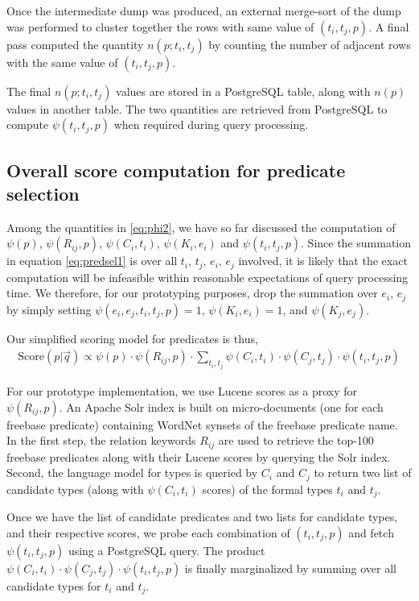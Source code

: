 \documentclass[a4paper, twoside, 12pt]{report}
\begin{document}
Once the intermediate dump was produced, an external merge-sort of the dump was performed to cluster together the rows with same value of $(t_i,t_j,p)$. A final pass computed the quantity $n(p;t_i,t_j)$ by counting the number of adjacent rows with the same value of $(t_i, t_j,p)$.

The final $n(p;t_i,t_j)$ values are stored in a PostgreSQL table, along with $n(p)$ values in another table. The two quantities are retrieved from PostgreSQL to compute $\psi(t_i,t_j,p)$ when required during query processing.

\subsection{Overall score computation for predicate selection}
Among the quantities in \ref{eq:phi2}, we have so far discussed the computation of $\psi(p)$, $\psi(R_{ij},p)$, $\psi(C_i,t_i)$, $\psi(K_i,e_i)$ and $\psi(t_i,t_j,p)$. Since the summation in equation \ref{eq:predsel1} is over all $t_i$, $t_j$, $e_i$, $e_j$ involved, it is likely that the exact computation will be infeasible within reasonable expectations of query processing time. We therefore, for our prototyping purposes, drop the summation over $e_i$, $e_j$ by simply setting $\psi(e_i,e_j,t_i,	t_j,p) = 1$, $\psi(K_i,e_i) = 1$, and $\psi(K_j,e_j)$.

Our simplified scoring model for predicates is thus, 
\begin{align}
\text{Score}(p|\vec{q}) \propto \psi(p) \cdot \psi(R_{ij},p) \cdot \sum_{t_i,t_j} \psi(C_i,t_i) \cdot \psi(C_j,t_j) \cdot \psi(t_i,t_j,p) \label{eq:predselfinal}
\end{align}

For our prototype implementation, we use Lucene scores as a proxy for $\psi(R_{ij}, p)$. An Apache Solr index is built on micro-documents (one for each freebase predicate) containing WordNet synsets of the freebase predicate name. In the first step, the relation keywords $R_{ij}$ are used to retrieve the top-100 freebase predicates along with their Lucene scores by querying the Solr index. Second, the language model for types is queried by $C_i$ and $C_j$ to return two list of candidate types (along with $\psi(C_i,t_i)$ scores) of the formal types $t_i$ and $t_j$.

Once we have the list of candidate predicates and two lists for candidate types, and their respective scores, we probe each combination of $(t_i,t_j,p)$
 and fetch $\psi(t_i,t_j,p)$ using a PostgreSQL query. The product $\psi(C_i,t_i) \cdot \psi(C_j,t_j) \cdot \psi(t_i,t_j,p)$ is finally marginalized by summing over all candidate types for $t_i$ and $t_j$.
 
\end{document}
